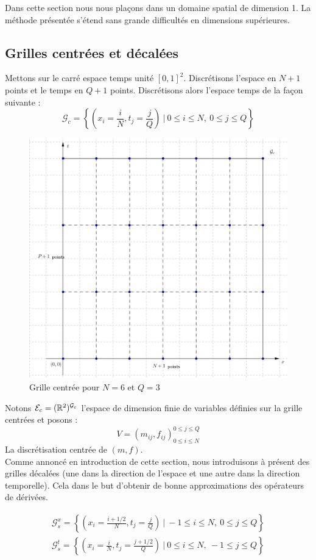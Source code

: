 \documentclass[a4paper,12pt]{article}
\begin{document}
Dans cette section nous nous plaçons dans un domaine spatial de dimension 1. La méthode présentée s'étend sans grande difficultés en dimensions supérieures. 

\subsection{Grilles centrées et décalées}
Mettons sur le carré espace temps unité $[0,1]^2$. Discrétisons l'espace en $N+1$ points et le temps en $Q+1$ points. Discrétisons alors l'espace temps de la façon suivante : 
$$
\mathcal{G}_c = \left\{(x_i=\frac{i}{N},t_j=\frac{j}{Q})\ |\ 0\leq i\leq N,\ 0\leq j\leq Q\right\}
$$
\begin{figure}[!h]
\centering
\includegraphics[width=0.8\linewidth]{img/grille_centree.png}
\caption{Grille centrée pour $N=6$ et $Q=3$}
\label{fig:centered}
\end{figure}

Notons $\mathcal{E}_c=(\mathbb{R}^2)^{\mathcal{G}_c}$ l'espace de dimension finie de variables définies sur la grille centrées et posons : 
$$
V = (m_{ij},f_{ij})_{0\leq i\leq N}^{0\leq j\leq Q}
$$
La discrétisation centrée de $(m,f)$. \\

Comme annoncé en introduction de cette section, nous introduisons à présent des grilles décalées (une dans la direction de l'espace et une autre dans la direction temporelle).  Cela dans le but d'obtenir de bonne approximations des opérateurs de dérivées. 

\begin{align}
\mathcal{G}_s^x = \left\{(x_i=\frac{i+1/2}{N},t_j=\frac{j}{Q})\ |\ -1\leq i\leq N,\ 0\leq j\leq Q\right\} \\
\mathcal{G}_s^t = \left\{(x_i=\frac{i}{N},t_j=\frac{j+1/2}{Q})\ |\ 0\leq i\leq N,\ -1\leq j\leq Q\right\}
\end{align}
\end{document}
